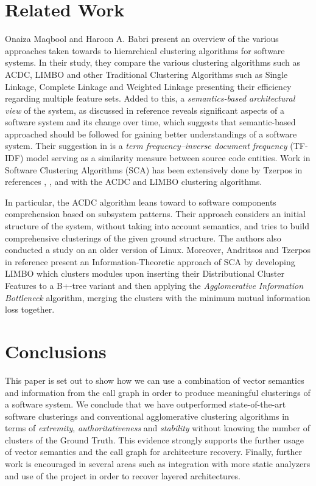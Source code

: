 \documentclass[sigconf,review, anonymous]{acmart}
\begin{document}
\section{Related Work}

Onaiza Maqbool and Haroon A. Babri \cite{maqbool_overview} present an
overview of the various approaches taken towards to hierarchical clustering algorithms
for software systems. In their study, they compare the various clustering algorithms
such as ACDC, LIMBO and other Traditional Clustering Algorithms such as Single
Linkage, Complete Linkage and Weighted Linkage presenting their efficiency regarding 
multiple feature sets. 
Added to this, a \emph{semantics-based architectural view} of the system, as discussed in reference
\cite{large_study} reveals significant aspects of a software system and its change over 
time, which suggests that semantic-based approached should be followed for gaining better 
understandings of a software system. Their suggestion in \cite{large_study} is a \emph{term frequency--inverse 
document frequency} (TF-IDF) model serving as a similarity measure between source code 
entities. 
Work in Software Clustering Algorithms (SCA) has been extensively done by Tzerpos in
references \cite{mojo}, \cite{stability}, \cite{acdc} and \cite{limbo} with the ACDC
and LIMBO clustering algorithms. 

In particular, the ACDC algorithm leans toward to software components comprehension 
based on subsystem patterns. Their approach considers an initial structure of the system, 
without taking into account semantics, and tries to build comprehensive clusterings of the given ground structure. 
The authors also conducted a study on an older version of  Linux. 
Moreover, Andritsos and Tzerpos in reference \cite{limbo} present an Information-Theoretic 
approach of SCA by developing LIMBO which clusters modules upon inserting their Distributional Cluster Features 
to a B+-tree variant and then applying the \emph{Agglomerative Information Bottleneck} algorithm, merging the 
clusters with the minimum mutual information loss together. 


\section{Conclusions} This paper is set out to show how we can use a combination of vector semantics
and information from the call graph in order to produce meaningful clusterings of a software system.
We conclude that we have outperformed state-of-the-art software clusterings and conventional
agglomerative clustering algorithms 
in terms of \emph{extremity}, \emph{authoritativeness} and \emph{stability} 
without knowing the number of clusters of the Ground Truth. This evidence strongly
supports the further usage of vector semantics and the call graph for architecture recovery.
Finally, further work is encouraged in several areas such as 
integration with more static analyzers and use of the project in order to recover layered architectures.


\newpage


\end{document}
